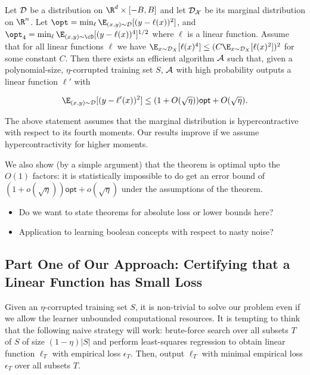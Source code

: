 \begin{theorem}
Let ${\cal D}$ be a distribution on $\R^{d} \times [-B,B]$ and let ${\cal D_{X}}$ be its
marginal distribution on $\R^n$.  Let $\opt = \min_{\ell} \E_{(x,y) \sim
  {\cal D}}[(y - \ell(x))^2]$, and $\opt_4 = \min_{\ell} \E_{(x,y) \sim \cD}[(y - \ell(x))^4]^{1/2}$ where $\ell$ is a linear function.
Assume that for all linear functions $\ell$ we have $\E_{x \sim {\cal
    D}_X}[\ell(x)^4] \leq  (C \E_{x \sim {\cal D}_X}[\ell(x)^2])^2$
for some constant $C$.
Then there exists an efficient algorithm ${\cal A}$ such that, given a
polynomial-size, $\eta$-corrupted training set $S$, ${\cal A}$ with high probability outputs a linear function $\ell'$ with 

$$ \E_{(x,y) \sim {\cal D}}[(y - \ell'(x))^2] \leq (1 +
O(\sqrt{\eta}))\mathsf{opt} + O(\sqrt{\eta}). $$
\end{theorem}

The above statement assumes that the marginal distribution is
hypercontractive with respect to its fourth moments.  Our results
improve if we assume hypercontractivity for higher moments. 

We also show (by a simple argument) that the theorem is optimal upto the $O(1)$ factors: it is statistically impossible to do get an error bound of $(1 + o(\sqrt{\eta})) \mathsf{opt} + o(\sqrt{\eta})$ under the assumptions of the theorem. 

\begin{itemize}

\item Do we want to state theorems for absolute loss or lower bounds here? 

\item Application to learning boolean concepts with respect to nasty
  noise?

\end{itemize}

\subsection{Part One of Our Approach: Certifying that a Linear
  Function has Small Loss}

Given an $\eta$-corrupted training set $S$, it is non-trivial to solve
our problem even if we allow the learner unbounded computational
resources.  It is tempting to think that the following naive strategy
will work: brute-force search over all subsets $T$ of $S$ of size
$(1 - \eta) |S|$ and perform least-squares regression to obtain linear
function $\ell_T$ with empirical loss $\epsilon_T$.  Then,
output $\ell_T$ with minimal empirical loss $\epsilon_T$ over all
subsets $T$. 

